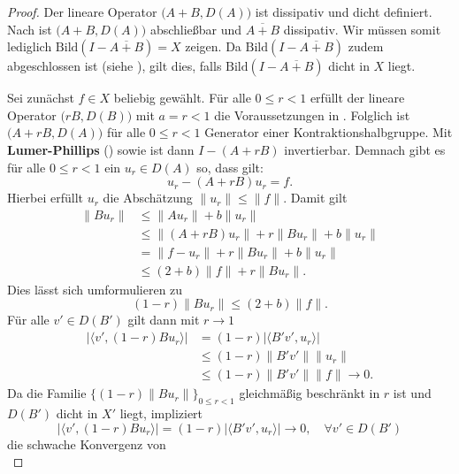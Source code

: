 \begin{proof}
Der lineare Operator $\big(A+B, D(A)\big)$ ist dissipativ und dicht definiert. Nach  ist  $\big(A+B, D(A)\big)$ abschließbar und $\overline{A+B}$ dissipativ. Wir müssen somit lediglich $\text{Bild}(I-\overline{A+B})=X$ zeigen. Da $\text{Bild}(I-\overline{A+B})$  zudem abgeschlossen ist (siehe ), gilt dies, falls $\text{Bild}(I-\overline{A+B})$ dicht in $X$ liegt.

\par
Sei zunächst $f\in X$ beliebig gewählt. Für alle $0\leq r <1$ erfüllt der lineare Operator $\big(rB, D(B)\big)$ mit $a=r<1$ die Voraussetzungen in . Folglich ist $\big(A+rB, D(A)\big)$ für alle $0\leq r <1$ Generator einer Kontraktionshalbgruppe. Mit \textbf{Lumer-Phillips} () sowie  ist dann $I-(A+rB)$ invertierbar. Demnach gibt es für alle $0\leq r <1$ ein $u_r\in D(A)$ so, dass gilt:
\begin{equation*}
    u_r-(A+rB)u_r=f.
\end{equation*}
Hierbei erfüllt $u_r$ die Abschätzung $\|u_r\|\leq \|f\|$. Damit gilt
\begin{align*}
\|Bu_r\|
&\leq \|Au_r\|+b\|u_r\|\\
&\leq \|(A+rB)u_r\| + r\|B u_r\|+ b\|u_r\|\\
&=\|f-u_r\| + r\|Bu_r\|+ b\|u_r\|\\
&\leq (2+b)\|f\|+r\|Bu_r\|.
\end{align*}
Dies lässt sich umformulieren zu
\begin{equation*}
    (1-r)\|Bu_r\|\leq (2+b)\|f\|.
\end{equation*}
Für alle $v'\in D(B')$ gilt dann mit $r\to 1$ 
\begin{align*}
|\langle v', (1-r)Bu_r\rangle |
&= (1-r)|\langle B'v', u_r\rangle |\\
&\leq (1-r)\|B' v'\|\|u_r\|\\
&\leq (1-r)\|B'v'\|\|f\|\to 0.
\end{align*}
Da die Familie $\{(1-r)\|Bu_r\|\}_{0\leq r<1}$ gleichmäßig beschränkt in $r$ ist und $D(B')$ dicht in $X'$ liegt, impliziert 
\begin{equation*}
    |\langle v', (1-r)Bu_r\rangle |= (1-r)|\langle B'v', u_r\rangle |\to 0,\quad \forall v'\in D(B')
\end{equation*} die schwache Konvergenz von
\begin{equation*}

\end{equation*}
\end{proof}
